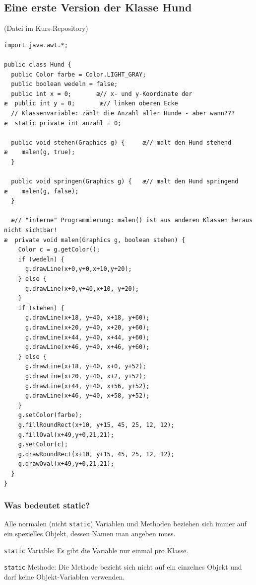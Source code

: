 \subsection{Eine erste Version der Klasse Hund}

(Datei  im Kurs-Repository)

\begin{lstlisting}
import java.awt.*;

public class Hund {
  public Color farbe = Color.LIGHT_GRAY;
  public boolean wedeln = false;
  public int x = 0;       æ// x- und y-Koordinate der
æ  public int y = 0;       æ// linken oberen Ecke
  // Klassenvariable: zählt die Anzahl aller Hunde - aber wann???
æ  static private int anzahl = 0;

  public void stehen(Graphics g) {     æ// malt den Hund stehend
æ    malen(g, true);
  }

  public void springen(Graphics g) {   æ// malt den Hund springend
æ    malen(g, false);
  }
  
  æ// "interne" Programmierung: malen() ist aus anderen Klassen heraus nicht sichtbar!
æ  private void malen(Graphics g, boolean stehen) {
    Color c = g.getColor();
    if (wedeln) {
      g.drawLine(x+0,y+0,x+10,y+20);
    } else {
      g.drawLine(x+0,y+40,x+10, y+20);
    }
    if (stehen) {
      g.drawLine(x+18, y+40, x+18, y+60);
      g.drawLine(x+20, y+40, x+20, y+60);
      g.drawLine(x+44, y+40, x+44, y+60);
      g.drawLine(x+46, y+40, x+46, y+60);
    } else {
      g.drawLine(x+18, y+40, x+0, y+52);
      g.drawLine(x+20, y+40, x+2, y+52);
      g.drawLine(x+44, y+40, x+56, y+52);
      g.drawLine(x+46, y+40, x+58, y+52);
    }
    g.setColor(farbe);
    g.fillRoundRect(x+10, y+15, 45, 25, 12, 12);
    g.fillOval(x+49,y+0,21,21);
    g.setColor(c);
    g.drawRoundRect(x+10, y+15, 45, 25, 12, 12);
    g.drawOval(x+49,y+0,21,21);
  }
}
\end{lstlisting}


\subsubsection{Was bedeutet static?}

Alle normalen (nicht \lstinline|static|) Variablen und Methoden beziehen sich
immer auf ein spezielles Objekt, dessen Namen man angeben muss.

\lstinline|static| Variable: Es gibt die Variable nur einmal pro Klasse.

\lstinline|static| Methode: Die Methode bezieht sich nicht auf ein einzelnes
Objekt und darf keine Objekt-Variablen verwenden.



